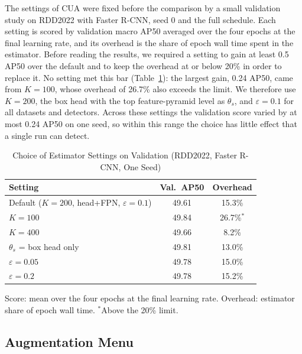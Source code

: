 \documentclass[conference]{IEEEtran}
\begin{document}
The settings of CUA were fixed before the comparison by a small validation study on RDD2022 with Faster R-CNN, seed 0 and the full schedule. Each setting is scored by validation macro AP50 averaged over the four epochs at the final learning rate, and its overhead is the share of epoch wall time spent in the estimator. Before reading the results, we required a setting to gain at least 0.5 AP50 over the default and to keep the overhead at or below 20\% in order to replace it. No setting met this bar (Table~\ref{tab:tuning}): the largest gain, 0.24 AP50, came from $K=100$, whose overhead of 26.7\% also exceeds the limit. We therefore use $K=200$, the box head with the top feature-pyramid level as $\theta_s$, and $\varepsilon=0.1$ for all datasets and detectors. Across these settings the validation score varied by at most 0.24 AP50 on one seed, so within this range the choice has little effect that a single run can detect.

\begin{table}[t]
\caption{Choice of Estimator Settings on Validation (RDD2022, Faster R-CNN, One Seed)}
\label{tab:tuning}
\centering
\footnotesize
\setlength{\tabcolsep}{4pt}
\begin{tabular}{@{}lcc@{}}
\toprule
\textbf{Setting} & \textbf{Val.\ AP50} & \textbf{Overhead} \\
\midrule
Default ($K{=}200$, head+FPN, $\varepsilon{=}0.1$) & 49.61 & 15.3\% \\
$K=100$ & 49.84 & 26.7\%$^{\ast}$ \\
$K=400$ & 49.66 & 8.2\% \\
$\theta_s$ = box head only & 49.81 & 13.0\% \\
$\varepsilon=0.05$ & 49.78 & 15.0\% \\
$\varepsilon=0.2$ & 49.78 & 15.2\% \\
\bottomrule
\end{tabular}
\vspace{2pt}

\parbox{\columnwidth}{\footnotesize Score: mean over the four epochs at the final learning rate. Overhead: estimator share of epoch wall time. $^{\ast}$Above the 20\% limit.}
\end{table}

\subsection{Augmentation Menu}
\label{sec:setup_menu}
\end{document}
